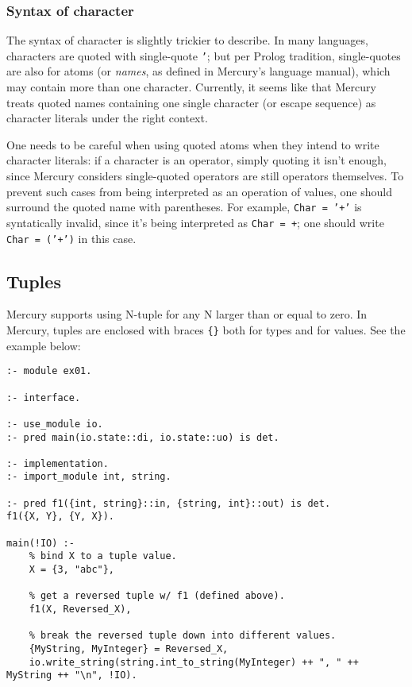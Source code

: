 \subsubsection{Syntax of character}

The syntax of character is slightly trickier to describe. In many languages, characters are quoted with single-quote \texttt{'}; but per Prolog tradition, single-quotes are also for atoms (or \textit{names}, as defined in Mercury's language manual), which may contain more than one character. Currently, it seems like that Mercury treats quoted names containing one single character (or escape sequence) as character literals under the right context.

One needs to be careful when using quoted atoms when they intend to write character literals: if a character is an operator, simply quoting it isn't enough, since Mercury considers single-quoted operators are still operators themselves. To prevent such cases from being interpreted as an operation of values, one should surround the quoted name with parentheses. For example, \texttt{Char = '+'} is syntatically invalid, since it's being interpreted as \texttt{Char = +}; one should write \texttt{Char = ('+')} in this case.

\subsection{Tuples}

Mercury supports using N-tuple for any N larger than or equal to zero. In Mercury, tuples are enclosed with braces \texttt{\{\}} both for types and for values. See the example below:

\begin{lstlisting}[language=Mercury]
:- module ex01.

:- interface.

:- use_module io.
:- pred main(io.state::di, io.state::uo) is det.

:- implementation.
:- import_module int, string.

:- pred f1({int, string}::in, {string, int}::out) is det.
f1({X, Y}, {Y, X}).

main(!IO) :-
    % bind X to a tuple value.
	X = {3, "abc"},

    % get a reversed tuple w/ f1 (defined above).
	f1(X, Reversed_X),

    % break the reversed tuple down into different values.
	{MyString, MyInteger} = Reversed_X,
	io.write_string(string.int_to_string(MyInteger) ++ ", " ++ MyString ++ "\n", !IO).
\end{lstlisting}

